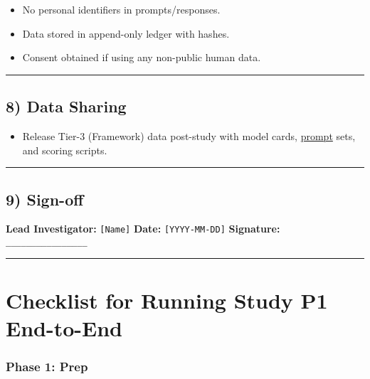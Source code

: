 \documentclass{article}
\begin{document}
\begin{itemize}
\item
  No personal identifiers in prompts/responses.
\item
  Data stored in append-only ledger with hashes.
\item
  Consent obtained if using any non-public human data.
\end{itemize}

\begin{center}\rule{0.5\linewidth}{0.5pt}\end{center}

\subsection*{8) Data Sharing}\label{data-sharing}

\begin{itemize}
\tightlist
\item
  Release Tier-3 (Framework) data post-study with model cards, \hyperlink{gloss:prompt}{prompt} sets, and scoring scripts.
\end{itemize}

\begin{center}\rule{0.5\linewidth}{0.5pt}\end{center}

\subsection*{9) Sign-off}\label{sign-off}

\textbf{Lead Investigator:} \texttt{{[}Name{]}} \textbf{Date:} \texttt{{[}YYYY-MM-DD{]}} \textbf{Signature:} \texttt{\_\_\_\_\_\_\_\_\_\_\_\_\_\_\_\_}

\begin{center}\rule{0.5\linewidth}{0.5pt}\end{center}

\section*{Checklist for Running Study P1 End-to-End}\label{checklist-for-running-study-p1-end-to-end}

\subsubsection*{Phase 1: Prep}\label{phase-1-prep}
\end{document}

